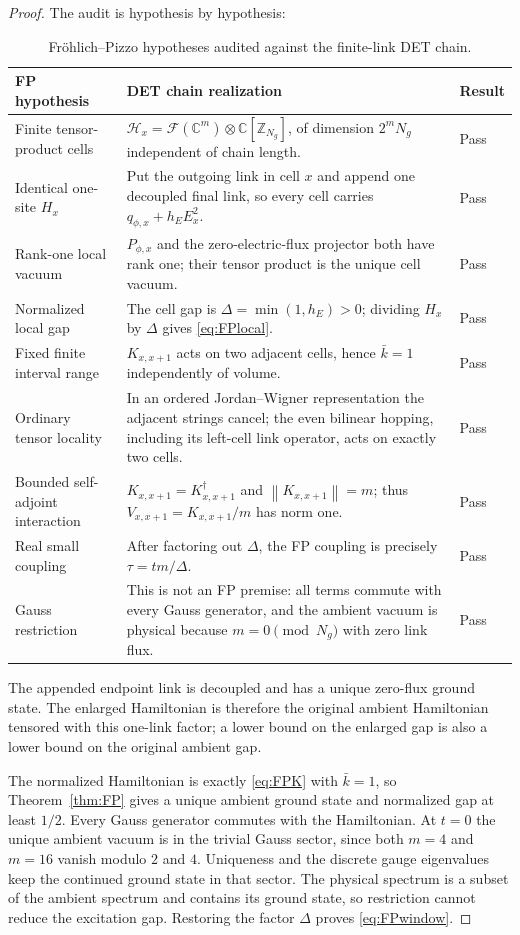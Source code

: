 \documentclass[11pt]{article}
\theoremstyle{remark}
\newcommand{\Hh}{\mathcal H}
\newcommand{\F}{\mathcal F}
\newcommand{\C}{\mathbb C}
\newcommand{\norm}[1]{\left\lVert #1\right\rVert}
\begin{document}
\begin{proof}
The audit is hypothesis by hypothesis:
\begin{table}[htbp]
\centering
\small
\begin{tabularx}{\textwidth}{@{}p{}X p{}@{}}
\toprule
\textbf{FP hypothesis}&\textbf{DET chain realization}&\textbf{Result}\\
\midrule
Finite tensor-product cells&
$\Hh_x=\F(\C^m)\otimes\C[\mathbb Z_{N_g}]$, of dimension
$2^mN_g$ independent of chain length.&Pass\\
Identical one-site $H_x$&
Put the outgoing link in cell $x$ and append one decoupled final link,
so every cell carries
$q_{\phi,x}+h_EE_x^2$.&Pass\\
Rank-one local vacuum&
$P_{\phi,x}$ and the zero-electric-flux projector both have rank one;
their tensor product is the unique cell vacuum.&Pass\\
Normalized local gap&
The cell gap is $\Delta=\min(1,h_E)>0$; dividing $H_x$ by $\Delta$
gives \eqref{eq:FPlocal}.&Pass\\
Fixed finite interval range&
$K_{x,x+1}$ acts on two adjacent cells, hence $\bar k=1$ independently
of volume.&Pass\\
Ordinary tensor locality&
In an ordered Jordan--Wigner representation the adjacent strings
cancel; the even bilinear hopping, including its left-cell link
operator, acts on exactly two cells.&Pass\\
Bounded self-adjoint interaction&
$K_{x,x+1}=K_{x,x+1}^{\dagger}$ and
$\norm{K_{x,x+1}}=m$; thus
$V_{x,x+1}=K_{x,x+1}/m$ has norm one.&Pass\\
Real small coupling&
After factoring out $\Delta$, the FP coupling is precisely
$\tau=tm/\Delta$.&Pass\\
Gauss restriction&
This is not an FP premise: all terms commute with every Gauss
generator, and the ambient vacuum is physical because
$m=0\pmod {N_g}$ with zero link flux.&Pass\\
\bottomrule
\end{tabularx}
\caption{Fröhlich--Pizzo hypotheses audited against the finite-link
DET chain.}
\label{tab:FPaudit}
\end{table}
The appended endpoint link is decoupled and has a unique zero-flux
ground state.  The enlarged Hamiltonian is therefore the original
ambient Hamiltonian tensored with this one-link factor; a lower bound
on the enlarged gap is also a lower bound on the original ambient gap.

The normalized Hamiltonian is exactly \eqref{eq:FPK} with
$\bar k=1$, so Theorem~\ref{thm:FP} gives a unique ambient ground state
and normalized gap at least $1/2$.  Every Gauss generator commutes with
the Hamiltonian.  At $t=0$ the unique ambient vacuum is in the trivial
Gauss sector, since both $m=4$ and $m=16$ vanish modulo $2$ and $4$.
Uniqueness and the discrete gauge eigenvalues keep the continued ground
state in that sector.  The physical spectrum is a subset of the ambient
spectrum and contains its ground state, so restriction cannot reduce
the excitation gap.  Restoring the factor $\Delta$ proves
\eqref{eq:FPwindow}.
\end{proof}
\end{document}
